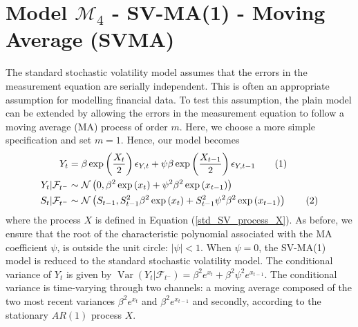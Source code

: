 \documentclass[11pt,a4,twosided,singlespacing,titlepagenumber=on]{scrreprt}
\numberwithin{equation}{chapter} %
\theoremstyle{remark}
\DeclareMathOperator{\var}{Var}
\newcommand\numberthis{\addtocounter{equation}{1}\tag{\theequation}}
\begin{document}
\section{Model $\mathcal{M}_4$ - SV-MA(1) - Moving Average (SVMA)}
The standard stochastic volatility model assumes that the errors in the measurement equation are serially independent. This is often an appropriate assumption for modelling financial data. To test this assumption, the plain model can be extended by allowing the errors in the measurement equation to follow a moving average (MA) process of order $m$. Here, we choose a more simple specification and set $m = 1$. Hence, our model becomes
\begin{align*}
Y_t									      &= \beta \exp \left( \frac{X_t}{2} \right) \epsilon_{Y,t} + \psi \beta \exp \left( \frac{X_{t-1}}{2} \right) \epsilon_{Y,t-1} \numberthis \\
Y_t	| \mathcal{F}_{t^-}		&\sim \mathcal{N} \left(0, \beta^2 \exp \left( x_t \right) + \psi^2 \beta^2 \exp \left( x_{t-1} \right) \right) \\
S_t | \mathcal{F}_{t^-}	  &\sim \mathcal{N} \left(S_{t-1}, S_{t-1}^2 \beta^2 \exp \left( x_t \right) +  S_{t-1}^2 \psi^2 \beta^2 \exp \left( x_{t-1} \right) \right) \numberthis
\end{align*}
where the process $X$ is defined in Equation (\ref{std_SV_process_X}). As before, we ensure that the root of the characteristic polynomial associated with the MA coefficient $\psi$, is outside the unit circle: $|\psi| < 1$. When $\psi = 0$, the SV-MA(1) model is reduced to the standard stochastic volatility model. The conditional
variance of $Y_t$ is given by $\var \left(Y_t | \mathcal{F}_{t^-} \right) = \beta^2 e^{x_t} + \beta^2 \psi^2 e^{x_{t-1}}$. The conditional variance is time-varying through two channels: a moving average composed of the two most recent variances $\beta^2 e^{x_t}$ and $\beta^2 e^{x_{t-1}}$ and secondly, according to the stationary $AR(1)$ process $X$.
\end{document}
